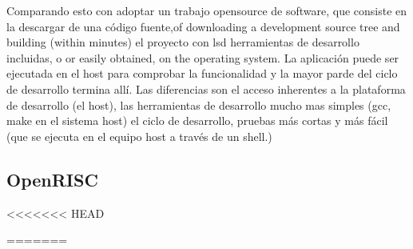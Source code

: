 Comparando esto con adoptar un trabajo opensource de software, que consiste en la descargar de una código fuente,of downloading a development source tree and building (within minutes) el proyecto con lsd herramientas de desarrollo incluidas, o  
or easily obtained, on the operating system. La aplicación puede ser ejecutada en el  host para comprobar la funcionalidad y la mayor parde del ciclo de desarrollo termina allí. Las diferencias son el acceso inherentes a la plataforma de desarrollo (el host), las herramientas de desarrollo mucho mas simples (gcc, make en el sistema host) el ciclo de desarrollo, pruebas más cortas y más fácil (que se ejecuta en el equipo host a través de un shell.)

		\subsection{OpenRISC}




\begin{figure}[h!]
 \begin{center}
  \label{fig:esquema}
 \end{center}
\end{figure}

<<<<<<< HEAD


=======

